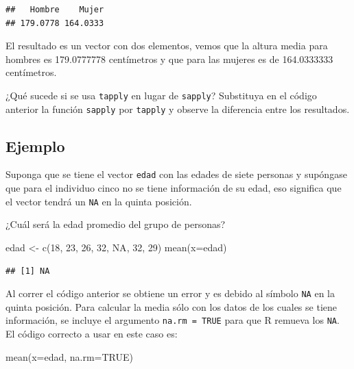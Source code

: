 \documentclass[
]{book}
\makeatletter
\newenvironment{Shaded}{\begin{snugshade}}{\end{snugshade}}
\newcommand{\AttributeTok}[1]{\textcolor[rgb]{0.77,0.63,0.00}{#1}}
\newcommand{\ConstantTok}[1]{\textcolor[rgb]{0.00,0.00,0.00}{#1}}
\newcommand{\DecValTok}[1]{\textcolor[rgb]{0.00,0.00,0.81}{#1}}
\newcommand{\FunctionTok}[1]{\textcolor[rgb]{0.00,0.00,0.00}{#1}}
\newcommand{\NormalTok}[1]{#1}
\newcommand{\OtherTok}[1]{\textcolor[rgb]{0.56,0.35,0.01}{#1}}
\newenvironment{kframe}{%
\medskip{}
\setlength{\fboxsep}{.8em}
 \def\at@end@of@kframe{}%
 \ifinner\ifhmode%
  \def\at@end@of@kframe{\end{minipage}}%
  \begin{minipage}{\columnwidth}%
 \fi\fi%
 \def\FrameCommand##1{\hskip\@totalleftmargin \hskip-\fboxsep
 \colorbox{shadecolor}{##1}\hskip-\fboxsep
     \hskip-\linewidth \hskip-\@totalleftmargin \hskip\columnwidth}%
 \MakeFramed {\advance\hsize-\width
   \@totalleftmargin\z@ \linewidth\hsize
   \@setminipage}}%
 {\par\unskip\endMakeFramed%
 \at@end@of@kframe}
\renewenvironment{Shaded}{\begin{kframe}}{\end{kframe}}
\makeatother
\begin{document}
\begin{verbatim}
##   Hombre    Mujer 
## 179.0778 164.0333
\end{verbatim}

El resultado es un vector con dos elementos, vemos que la altura media para hombres es 179.0777778 centímetros y que para las mujeres es de 164.0333333 centímetros.

¿Qué sucede si se usa \texttt{tapply} en lugar de \texttt{sapply}? Substituya en el código anterior la función \texttt{sapply} por \texttt{tapply} y observe la diferencia entre los resultados.

\hypertarget{ejemplo-32}{%
\subsection*{Ejemplo}\label{ejemplo-32}}

Suponga que se tiene el vector \texttt{edad} con las edades de siete personas y supóngase que para el individuo cinco no se tiene información de su edad, eso significa que el vector tendrá un \texttt{NA} en la quinta posición.

¿Cuál será la edad promedio del grupo de personas?

\begin{Shaded}
\begin{Highlighting}[]
\NormalTok{edad }\OtherTok{\textless{}{-}} \FunctionTok{c}\NormalTok{(}\DecValTok{18}\NormalTok{, }\DecValTok{23}\NormalTok{, }\DecValTok{26}\NormalTok{, }\DecValTok{32}\NormalTok{, }\ConstantTok{NA}\NormalTok{, }\DecValTok{32}\NormalTok{, }\DecValTok{29}\NormalTok{)}
\FunctionTok{mean}\NormalTok{(}\AttributeTok{x=}\NormalTok{edad)}
\end{Highlighting}
\end{Shaded}

\begin{verbatim}
## [1] NA
\end{verbatim}

Al correr el código anterior se obtiene un error y es debido al símbolo \texttt{NA} en la quinta posición. Para calcular la media sólo con los datos de los cuales se tiene información, se incluye el argumento \texttt{na.rm\ =\ TRUE} para que R remueva los \texttt{NA}. El código correcto a usar en este caso es:

\begin{Shaded}
\begin{Highlighting}[]
\FunctionTok{mean}\NormalTok{(}\AttributeTok{x=}\NormalTok{edad, }\AttributeTok{na.rm=}\ConstantTok{TRUE}\NormalTok{)}
\end{Highlighting}
\end{Shaded}
\end{document}
